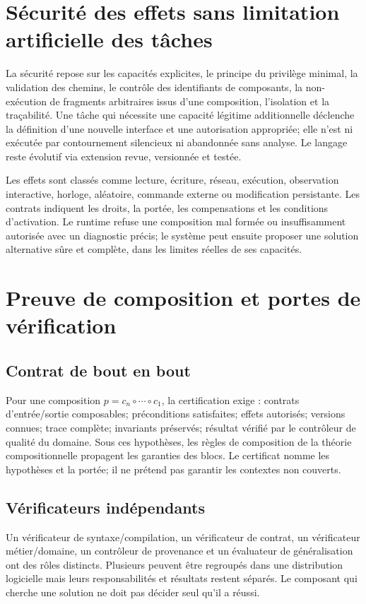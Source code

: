 \documentclass[11pt,a4paper]{article}
\begin{document}
\section{Sécurité des effets sans limitation artificielle des tâches}
La sécurité repose sur les capacités explicites, le principe du privilège minimal, la validation des chemins, le contrôle des identifiants de composants, la non-exécution de fragments arbitraires issus d'une composition, l'isolation et la traçabilité. Une tâche qui nécessite une capacité légitime additionnelle déclenche la définition d'une nouvelle interface et une autorisation appropriée; elle n'est ni exécutée par contournement silencieux ni abandonnée sans analyse. Le langage reste évolutif via extension revue, versionnée et testée.

Les effets sont classés comme lecture, écriture, réseau, exécution, observation interactive, horloge, aléatoire, commande externe ou modification persistante. Les contrats indiquent les droits, la portée, les compensations et les conditions d'activation. Le runtime refuse une composition mal formée ou insuffisamment autorisée avec un diagnostic précis; le système peut ensuite proposer une solution alternative sûre et complète, dans les limites réelles de ses capacités.

\section{Preuve de composition et portes de vérification}
\subsection{Contrat de bout en bout}
Pour une composition $p=c_n\circ\cdots\circ c_1$, la certification exige : contrats d'entrée/sortie composables; préconditions satisfaites; effets autorisés; versions connues; trace complète; invariants préservés; résultat vérifié par le contrôleur de qualité du domaine. Sous ces hypothèses, les règles de composition de la théorie compositionnelle propagent les garanties des blocs. Le certificat nomme les hypothèses et la portée; il ne prétend pas garantir les contextes non couverts.

\subsection{Vérificateurs indépendants}
Un vérificateur de syntaxe/compilation, un vérificateur de contrat, un vérificateur métier/domaine, un contrôleur de provenance et un évaluateur de généralisation ont des rôles distincts. Plusieurs peuvent être regroupés dans une distribution logicielle mais leurs responsabilités et résultats restent séparés. Le composant qui cherche une solution ne doit pas décider seul qu'il a réussi.
\end{document}
